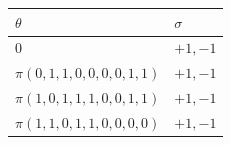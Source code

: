\begin{center}\small\begin{tabular}{ll}
\hline
$\theta$ & $\sigma$\\
\hline
$0$ & $+1,-1$\\
$\pi(0,1,1,0,0,0,0,1,1)$ & $+1,-1$\\
$\pi(1,0,1,1,1,0,0,1,1)$ & $+1,-1$\\
$\pi(1,1,0,1,1,0,0,0,0)$ & $+1,-1$\\
\hline
\end{tabular}\end{center}
